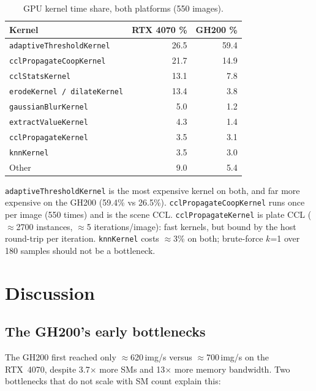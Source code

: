 \begin{table}[H]
\centering
\small
\begin{tabular}{lrr}
\toprule
Kernel & RTX 4070 \% & GH200 \% \\
\midrule
\texttt{adaptiveThresholdKernel}    & 26.5 & 59.4 \\
\texttt{cclPropagateCoopKernel}     & 21.7 & 14.9 \\
\texttt{cclStatsKernel}             & 13.1 &  7.8 \\
\texttt{erodeKernel / dilateKernel} & 13.4 &  3.8 \\
\texttt{gaussianBlurKernel}         &  5.0 &  1.2 \\
\texttt{extractValueKernel}         &  4.3 &  1.4 \\
\texttt{cclPropagateKernel}         &  3.5 &  3.1 \\
\texttt{knnKernel}                  &  3.5 &  3.0 \\
Other                               &  9.0 &  5.4 \\
\bottomrule
\end{tabular}
\normalsize
\caption{GPU kernel time share, both platforms (550 images).}
\label{tab:kern_sum}
\end{table}

\texttt{adaptiveThresholdKernel} is the most expensive kernel on both, and far more expensive on the GH200 (59.4\% vs 26.5\%).
\texttt{cclPropagateCoopKernel} runs once per image (550 times) and is the scene CCL.
\texttt{cclPropagateKernel} is plate CCL ($\approx$2700 instances, $\approx$5 iterations/image): fast kernels, but bound by the host round-trip per iteration.
\texttt{knnKernel} costs $\approx$3\% on both; brute-force $k$=1 over 180 samples should not be a bottleneck.

\section{Discussion}
\label{sec:discussion}

\subsection{The GH200's early bottlenecks}

The GH200 first reached only $\approx$620\,img/s versus $\approx$700\,img/s on the RTX~4070, despite 3.7$\times$ more SMs and 13$\times$ more memory bandwidth.
Two bottlenecks that do not scale with SM count explain this:

